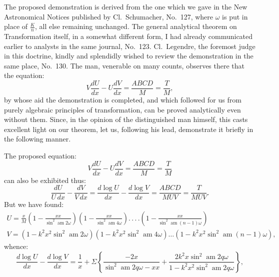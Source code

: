 \documentclass{article}
\begin{document}
The proposed demonstration is derived from the one which we gave in the New Astronomical Notices published by Cl.\ Schumacher, No.\ 127, where $\omega$ is put in place of $\frac{K}{n}$, all else remaining unchanged. The general analytical theorem on Transformation itself, in a somewhat different form, I had already communicated earlier to analysts in the same journal, No.\ 123. Cl.\ Legendre, the foremost judge in this doctrine, kindly and splendidly wished to review the demonstration in the same place, No.\ 130. The man, venerable on many counts, observes there that the equation:
\[
V\frac{dU}{dx}-U\frac{dV}{dx}=\frac{ABCD}{M}=\frac{T}{M},
\]
by whose aid the demonstration is completed, and which followed for us from purely algebraic principles of transformation, can be proved analytically even without them. Since, in the opinion of the distinguished man himself, this casts excellent light on our theorem, let us, following his lead, demonstrate it briefly in the following manner.

The proposed equation:
\[
V\frac{dU}{dx}-U\frac{dV}{dx}=\frac{ABCD}{M}=\frac{T}{M}
\]
can also be exhibited thus:
\[
\frac{dU}{U\,dx}-\frac{dV}{V\,dx}=\frac{d\log U}{dx}-\frac{d\log V}{dx}=\frac{ABCD}{MUV}=\frac{T}{MUV}.
\]
But we have found:
\[
\begin{gathered}
U=\frac{x}{M}\left(1-\frac{xx}{\sin^{2}\operatorname{am}2\omega}\right)\left(1-\frac{xx}{\sin^{2}\operatorname{am}4\omega}\right).\,.\,.\,.\left(1-\frac{xx}{\sin^{2}\operatorname{am}(n-1)\omega}\right)\\[1.5ex]
V=\left(1-k^{2}x^{2}\sin^{2}\operatorname{am}2\omega\right)\left(1-k^{2}x^{2}\sin^{2}\operatorname{am}4\omega\right)\ldots\left(1-k^{2}x^{2}\sin^{2}\operatorname{am}(n-1)\omega\right),
\end{gathered}
\]
whence:
\[
\frac{d\log U}{dx}-\frac{d\log V}{dx}=\frac{1}{x}+\Sigma\left\{\frac{-2x}{\sin^{2}\operatorname{am}2q\omega-xx}+\frac{2k^{2}x\sin^{2}\operatorname{am}2q\omega}{1-k^{2}x^{2}\sin^{2}\operatorname{am}2q\omega}\right\},
\]
\end{document}
